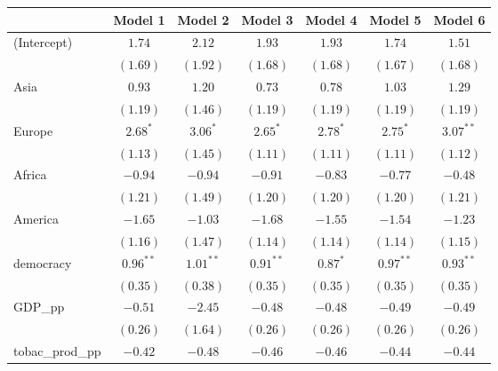 
\begin{table}[!h]
\begin{center}
\begin{tabular}{l c c c c c c }
\toprule
 & Model 1 & Model 2 & Model 3 & Model 4 & Model 5 & Model 6 \\
\midrule
(Intercept)             & $1.74$       & $2.12$       & $1.93$       & $1.93$       & $1.74$       & $1.51$       \\
                        & $(1.69)$     & $(1.92)$     & $(1.68)$     & $(1.68)$     & $(1.67)$     & $(1.68)$     \\
Asia                    & $0.93$       & $1.20$       & $0.73$       & $0.78$       & $1.03$       & $1.29$       \\
                        & $(1.19)$     & $(1.46)$     & $(1.19)$     & $(1.19)$     & $(1.19)$     & $(1.19)$     \\
Europe                  & $2.68^{*}$   & $3.06^{*}$   & $2.65^{*}$   & $2.78^{*}$   & $2.75^{*}$   & $3.07^{**}$  \\
                        & $(1.13)$     & $(1.45)$     & $(1.11)$     & $(1.11)$     & $(1.11)$     & $(1.12)$     \\
Africa                  & $-0.94$      & $-0.94$      & $-0.91$      & $-0.83$      & $-0.77$      & $-0.48$      \\
                        & $(1.21)$     & $(1.49)$     & $(1.20)$     & $(1.20)$     & $(1.20)$     & $(1.21)$     \\
America                 & $-1.65$      & $-1.03$      & $-1.68$      & $-1.55$      & $-1.54$      & $-1.23$      \\
                        & $(1.16)$     & $(1.47)$     & $(1.14)$     & $(1.14)$     & $(1.14)$     & $(1.15)$     \\
democracy               & $0.96^{**}$  & $1.01^{**}$  & $0.91^{**}$  & $0.87^{*}$   & $0.97^{**}$  & $0.93^{**}$  \\
                        & $(0.35)$     & $(0.38)$     & $(0.35)$     & $(0.35)$     & $(0.35)$     & $(0.35)$     \\
GDP\_pp                 & $-0.51$      & $-2.45$      & $-0.48$      & $-0.48$      & $-0.49$      & $-0.49$      \\
                        & $(0.26)$     & $(1.64)$     & $(0.26)$     & $(0.26)$     & $(0.26)$     & $(0.26)$     \\
tobac\_prod\_pp         & $-0.42$      & $-0.48$      & $-0.46$      & $-0.46$      & $-0.44$      & $-0.44$      \\

\end{tabular}
\end{center}
\end{table}
